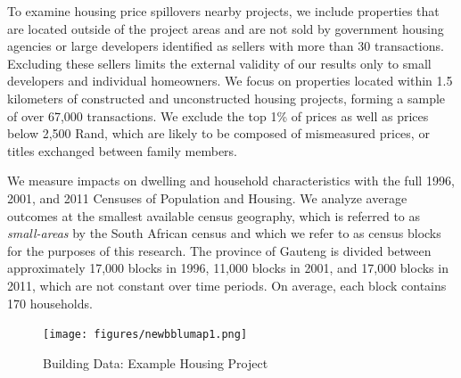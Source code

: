 \documentclass[12pt]{article}
\begin{document}

To examine housing price spillovers nearby projects, we include properties that are located outside of the project areas and are not sold by government housing agencies or large developers identified as sellers with more than 30 transactions.  Excluding these sellers limits the external validity of our results only to small developers and individual homeowners.  We focus on properties located within 1.5 kilometers of constructed and unconstructed housing projects, forming a sample of over 67,000 transactions.  We exclude the top 1\% of prices as well as prices below 2,500 Rand, which are likely to be composed of mismeasured prices, or titles exchanged between family members. 



We measure impacts on dwelling and household characteristics with the full 1996, 2001, and 2011 Censuses of Population and Housing. We analyze average outcomes at the smallest available census geography, which is referred to as {\it small-areas} by the South African census and which we refer to as census blocks for the purposes of this research.  The province of Gauteng is divided between approximately 17,000 blocks in 1996, 11,000 blocks in 2001, and 17,000 blocks in 2011, which are not constant over time periods.  On average, each block contains 170 households. 


\begin{figure}[t!]
        \centering
        \caption[ Building Data: Example Housing Project]
        {\small Building Data: Example Housing Project } 
        \vspace{2mm}
\texttt{[image: figures/newbblumap1.png]}
        \label{fig:bblumaps}
\end{figure} 
\end{document}

